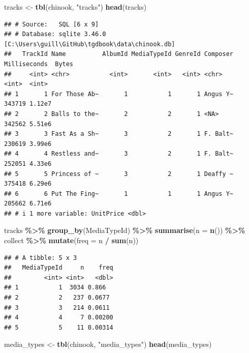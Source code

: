 \documentclass[
]{book}
\newenvironment{Shaded}{\begin{snugshade}}{\end{snugshade}}
\newcommand{\AttributeTok}[1]{\textcolor[rgb]{0.13,0.29,0.53}{#1}}
\newcommand{\FunctionTok}[1]{\textcolor[rgb]{0.13,0.29,0.53}{\textbf{#1}}}
\newcommand{\NormalTok}[1]{#1}
\newcommand{\OtherTok}[1]{\textcolor[rgb]{0.56,0.35,0.01}{#1}}
\newcommand{\SpecialCharTok}[1]{\textcolor[rgb]{0.81,0.36,0.00}{\textbf{#1}}}
\newcommand{\StringTok}[1]{\textcolor[rgb]{0.31,0.60,0.02}{#1}}
\begin{document}
\begin{enumerate}
\begin{Shaded}
\begin{Highlighting}[]
\NormalTok{tracks }\OtherTok{\textless{}{-}} \FunctionTok{tbl}\NormalTok{(chinook, }\StringTok{"tracks"}\NormalTok{)}
\FunctionTok{head}\NormalTok{(tracks) }
\end{Highlighting}
\end{Shaded}

\begin{verbatim}
## # Source:   SQL [6 x 9]
## # Database: sqlite 3.46.0 [C:\Users\guill\GitHub\tgdbook\data\chinook.db]
##   TrackId Name          AlbumId MediaTypeId GenreId Composer Milliseconds  Bytes
##     <int> <chr>           <int>       <int>   <int> <chr>           <int>  <int>
## 1       1 For Those Ab~       1           1       1 Angus Y~       343719 1.12e7
## 2       2 Balls to the~       2           2       1 <NA>           342562 5.51e6
## 3       3 Fast As a Sh~       3           2       1 F. Balt~       230619 3.99e6
## 4       4 Restless and~       3           2       1 F. Balt~       252051 4.33e6
## 5       5 Princess of ~       3           2       1 Deaffy ~       375418 6.29e6
## 6       6 Put The Fing~       1           1       1 Angus Y~       205662 6.71e6
## # i 1 more variable: UnitPrice <dbl>
\end{verbatim}

\begin{Shaded}
\begin{Highlighting}[]
\NormalTok{tracks }\SpecialCharTok{\%\textgreater{}\%} \FunctionTok{group\_by}\NormalTok{(MediaTypeId) }\SpecialCharTok{\%\textgreater{}\%} 
    \FunctionTok{summarise}\NormalTok{(}\AttributeTok{n =} \FunctionTok{n}\NormalTok{()) }\SpecialCharTok{\%\textgreater{}\%}\NormalTok{ collect }\SpecialCharTok{\%\textgreater{}\%} \FunctionTok{mutate}\NormalTok{(}\AttributeTok{freq =}\NormalTok{ n }\SpecialCharTok{/} \FunctionTok{sum}\NormalTok{(n))}
\end{Highlighting}
\end{Shaded}

\begin{verbatim}
## # A tibble: 5 x 3
##   MediaTypeId     n    freq
##         <int> <int>   <dbl>
## 1           1  3034 0.866  
## 2           2   237 0.0677 
## 3           3   214 0.0611 
## 4           4     7 0.00200
## 5           5    11 0.00314
\end{verbatim}

\begin{Shaded}
\begin{Highlighting}[]
\NormalTok{media\_types }\OtherTok{\textless{}{-}} \FunctionTok{tbl}\NormalTok{(chinook, }\StringTok{"media\_types"}\NormalTok{)}
\FunctionTok{head}\NormalTok{(media\_types)}
\end{Highlighting}
\end{Shaded}


\end{enumerate}
\end{document}
